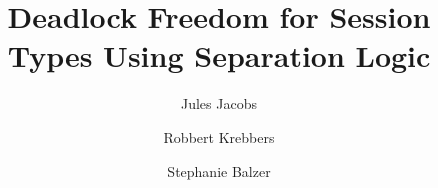 \documentclass{acmart} %
\title{Deadlock Freedom for Session Types Using Separation Logic}
\author{Jules Jacobs}
\author{Robbert Krebbers}
\author{Stephanie Balzer}
\begin{document}
\begin{abstract}

\end{abstract}

\maketitle







\end{document}
